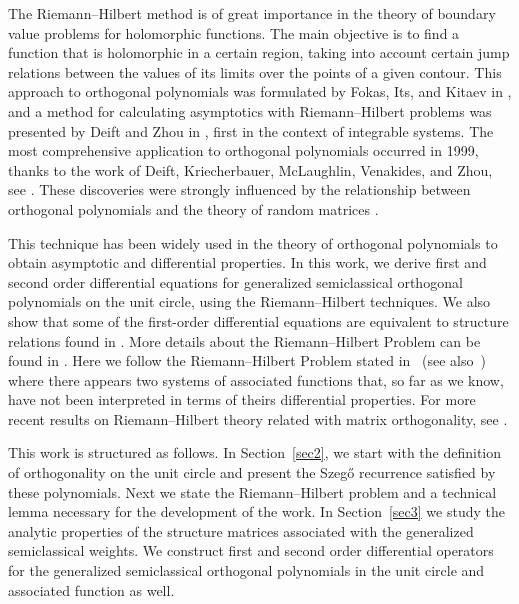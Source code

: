 \documentclass[12pt]{amsart}
\begin{document}
The Riemann--Hilbert method is of great importance in the theory of boundary value problems for holomorphic functions. The main objective is to find a function that is holomorphic in a certain region, taking into account certain jump relations between the values of its limits over the points of a given contour. This approach to orthogonal polynomials was formulated by Fokas, Its, and Kitaev in \cite{FIK92}, and a method for calculating asymptotics with Riemann--Hilbert problems was presented by Deift and Zhou in \cite{De93}, first in the context of integrable systems. The most comprehensive application to orthogonal polynomials occurred in 1999, thanks to the work of Deift, Kriecherbauer, McLaughlin, Venakides, and Zhou, see \cite{De99, DKMVZ1, DKMVZ2}. These discoveries were strongly influenced by the relationship between orthogonal polynomials and the theory of random matrices \cite{CKV08, DIZ97}.

This technique has been widely used in the theory of orthogonal polynomials to obtain asymptotic and differential properties. In this work, we derive first and second order differential equations for generalized semiclassical orthogonal polynomials on the unit circle, using the Riemann--Hilbert techniques. We also show that some of the first-order differential equations are equivalent to structure relations found in \cite{BRS23}.
More details about the Riemann--Hilbert Problem can be found in \cite{ AF97, BI03, DIK11}.
Here we follow the Riemann--Hilbert Problem stated in~\cite{DIK11} (see also~\cite{Mf06}) where there appears two systems of associated functions that, so far as we know, have not been interpreted in terms of theirs differential properties.
For more recent results on Riemann--Hilbert theory related with matrix orthogonality, see \cite{BFFM22, BFFM, CM19, CCMa19}.


This work is structured as follows. 
In Section~\ref{sec2},
we start with the definition of orthogonality on the unit circle and present the Szeg\H{o} recurrence satisfied by these polynomials.
Next we state the Riemann--Hilbert problem and a technical lemma necessary for the development of the work. 
In Section~\ref{sec3} we study the analytic properties of the structure matrices associated with the generalized semiclassical weights.
We construct first and second order differential operators for the generalized semiclassical orthogonal polynomials in the unit circle and
associated function as well.
\end{document}

